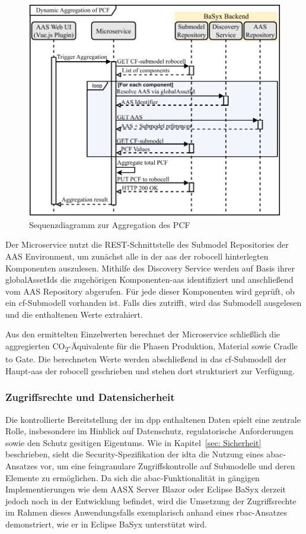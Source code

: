 \newpage
\begin{figure}[htbp]
    \centering
        \includegraphics[width=1\textwidth]{Bilder/DPP/Sequenzdiagramm_Neu.pdf}
    
    \caption{Sequenzdiagramm zur Aggregation des PCF}
    \label{fig:SequenzdiagrammPCF}
\end{figure}

Der Microservice nutzt die REST-Schnittstelle des Submodel Repositories der AAS Environment, um zunächst alle in der \acs{aas} der robocell hinterlegten Komponenten auszulesen. 
Mithilfe des Discovery Service werden auf Basis ihrer globalAssetIds die zugehörigen Komponenten-\acs{aas} identifiziert und anschließend vom AAS Repository abgerufen.
Für jede dieser Komponenten wird geprüft, ob ein \acs{cf}-Submodell vorhanden ist. 
Falls dies zutrifft, wird das Submodell ausgelesen und die enthaltenen Werte extrahiert.

Aus den ermittelten Einzelwerten berechnet der Microservice schließlich die aggregierten CO\textsubscript{2}-Äquivalente für die Phasen Produktion, Material sowie Cradle to Gate. 
Die berechneten Werte werden abschließend in das \acs{cf}-Submodell der Haupt-\acs{aas} der robocell geschrieben und stehen dort strukturiert zur Verfügung.

\subsubsection{Zugriffsrechte und Datensicherheit}
Die kontrollierte Bereitstellung der im \acs{dpp} enthaltenen Daten spielt eine zentrale Rolle, insbesondere im Hinblick auf Datenschutz, regulatorische Anforderungen sowie den Schutz gesitigen Eigentums. 
Wie in Kapitel~\ref{sec: Sicherheit} beschrieben, sieht die Security-Spezifikation der \acs{idta} die Nutzung eines \acs{abac}-Ansatzes vor, um eine feingranulare Zugriffskontrolle auf Submodelle und deren Elemente zu ermöglichen.
Da sich die \acs{abac}-Funktionalität in gängigen Implementierungen wie dem AASX Server Blazor oder Eclipse BaSyx derzeit jedoch noch in der Entwicklung befindet, wird die Umsetzung der Zugriffsrechte im Rahmen dieses Anwendungsfalls exemplarisch anhand eines \acs{rbac}-Ansatzes demonstriert, wie er in Eclipse BaSyx unterstützt wird.

